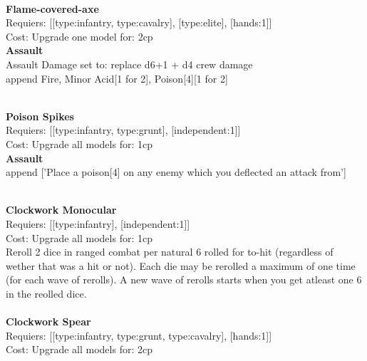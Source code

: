 \ \\
{\bf Flame-covered-axe } \\

Requiers: [[type:infantry, type:cavalry], [type:elite], [hands:1]] \\
Cost: Upgrade one model for: 2cp \\




{\bf Assault} \ \\
Assault Damage set to: replace d6+1 + d4 crew damage
\\ 

append Fire, Minor Acid[1 for 2], Poison[4][1 for 2]


\ \\
{\bf Poison Spikes } \\

Requiers: [[type:infantry, type:grunt], [independent:1]] \\
Cost: Upgrade all models for: 1cp \\




{\bf Assault} \ \\

append ['Place a poison[4] on any enemy which you deflected an attack from']


\ \\
{\bf Clockwork Monocular } \\

Requiers: [[type:infantry], [independent:1]] \\
Cost: Upgrade all models for: 1cp \\
Reroll 2 dice in ranged combat per natural 6 rolled for to-hit (regardless of wether that was a hit or not). Each die may be rerolled a maximum of one time (for each wave of rerolls). A new wave of rerolls starts when you get atleast one 6 in the reolled dice.\\ 









\ \\
{\bf Clockwork Spear } \\

Requiers: [[type:infantry, type:grunt, type:cavalry], [hands:1]] \\
Cost: Upgrade all models for: 2cp \\




